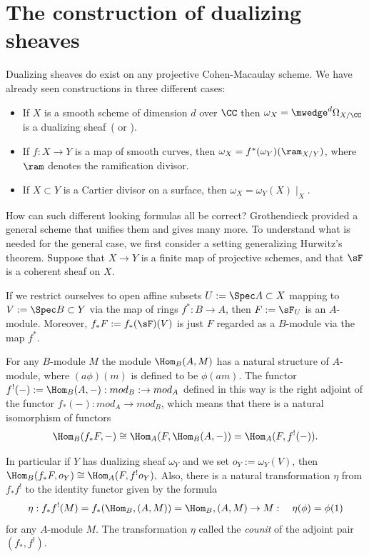 \section{The construction of dualizing sheaves}\label{dualizing sheaves section}
Dualizing sheaves do exist on any projective Cohen-Macaulay scheme. We have already seen constructions
in three different cases:
\begin{itemize}
 \item If $X$ is a smooth scheme of dimension $d$ over $\CC$ then $\omega_{X}= \mwedge^{d} \Omega_{X/\CC}$
is a dualizing sheaf~(\cite[Hartshorne[Section III.7]{Hartshorne1977} or  \cite[p. 648, 708]{Griffiths-Harris1978}). 
\item If $f: X\to Y$ is a map of smooth curves, then $\omega_{X} = f^{*}(\omega_{Y})(\ram_{X/Y})$, where
$\ram$ denotes the ramification divisor.
\item If $X\subset Y$ is a Cartier divisor on a surface, then $\omega_{X} = \omega_{Y}(X)\mid_{X}$.
\end{itemize}

How can such different looking formulas all be correct? Grothendieck provided a general scheme
that unifies them and gives many more. 
To understand what is needed for the general case, we first consider a setting generalizing Hurwitz's theorem.
Suppose that $X\to Y$ is a finite map of projective schemes, and that $\sF$ is a coherent sheaf on $X$.

If we restrict ourselves to open affine subsets
$U := \Spec A\subset X$ mapping to $V:= \Spec B\subset Y$ via the map of rings $f^{*}:B\to A$, then 
$F := \sF_{U}$ is an $A$-module. Moreover,
$f_*{F} := f_*(\sF)(V)$ is just $F$ regarded as a $B$-module via the map $f^{*}$.

For any $B$-module $M$ the module $\Hom_{B}(A, M)$ has a natural structure of $A$-module,
where $(a\phi)(m)$ is defined to be $\phi(am)$. The functor $f^{!}(-) := \Hom_{B}(A, -): mod_{B}:\to mod_{A}$ 
defined in this way is the right adjoint of the functor $f_{*}(-): mod_{A}\to mod_{B}$, 
which means that there is a natural isomorphism of functors
$$
\Hom_{B}(f_{*}F, -) \cong \Hom_{A}(F, \Hom_{B}(A, -)) = \Hom_{A}(F, f^{!}(-)).
$$

In particular if $Y$ has dualizing sheaf $\omega_Y$ and we set $o_Y := \omega_Y(V)$, then
$
\Hom_{B}(f_{*}F, o_{Y}) \cong \Hom_{A}(F, f^{!}o_{Y}),
$
Also, there is a natural transformation $\eta$ from $ f_{*}f^{!}$ to the identity functor given by the formula
$$
\eta: f_{*}f^{!}(M) = f_{*}(\Hom_{B}, (A,M)) = \Hom_{B}, (A,M) \to M:\quad \eta(\phi) = \phi(1)
$$
for any $A$-module $M$. 
The transformation $\eta$ called the \emph{counit} of the adjoint pair $(f_{*}, f^{!})$.

